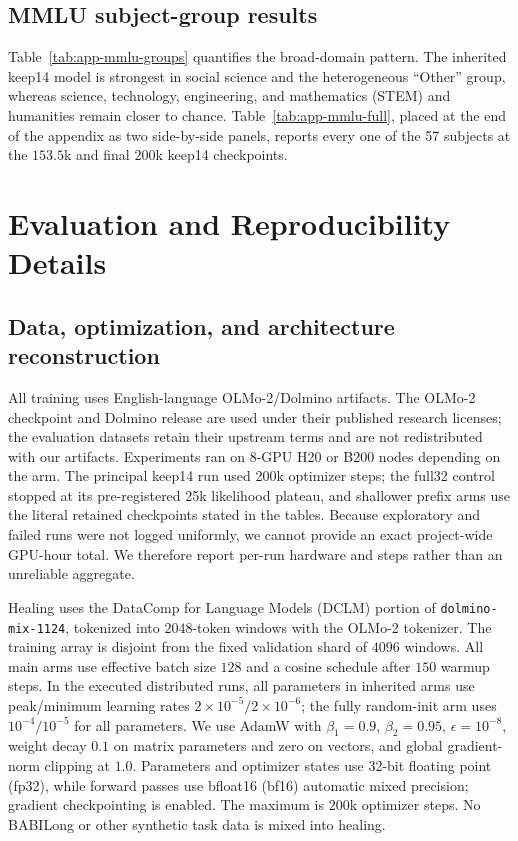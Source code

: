 \subsection{MMLU subject-group results}
\label{app:mmlu-subjects}


Table~\ref{tab:app-mmlu-groups} quantifies the broad-domain pattern. The inherited keep14 model is strongest in
social science and the heterogeneous ``Other'' group, whereas science, technology, engineering, and mathematics (STEM) and humanities
remain closer to chance. Table~\ref{tab:app-mmlu-full}, placed at the
end of the appendix as two side-by-side panels, reports every one of the 57
subjects at the $153.5$k and final $200$k keep14 checkpoints.

\section{Evaluation and Reproducibility Details}
\label{app:repro}

\subsection{Data, optimization, and architecture reconstruction}

All training uses English-language OLMo-2/Dolmino artifacts. The OLMo-2
checkpoint and Dolmino release are used under their published research licenses;
the evaluation datasets retain their upstream terms and are not redistributed
with our artifacts. Experiments ran on 8-GPU H20 or B200 nodes depending on the
arm. The principal keep14 run used 200k optimizer steps; the full32 control
stopped at its pre-registered 25k likelihood plateau, and shallower prefix arms
use the literal retained checkpoints stated in the tables. Because exploratory
and failed runs were not logged uniformly, we cannot provide an exact
project-wide GPU-hour total. We therefore report per-run hardware and steps
rather than an unreliable aggregate.

Healing uses the DataComp for Language Models (DCLM) portion of
\texttt{dolmino-mix-1124}, tokenized into $2048$-token windows with the OLMo-2
tokenizer. The training array is disjoint from the fixed validation shard of
$4096$ windows. All main arms use effective batch size $128$ and a cosine
schedule after $150$ warmup steps. In the executed distributed runs, all
parameters in inherited arms use peak/minimum learning rates
$2\times10^{-5}/2\times10^{-6}$; the fully random-init arm uses
$10^{-4}/10^{-5}$ for all parameters. We use AdamW with $\beta_1{=}0.9$,
$\beta_2{=}0.95$, $\epsilon{=}10^{-8}$, weight decay $0.1$ on matrix parameters
and zero on vectors, and global gradient-norm clipping at $1.0$. Parameters and
optimizer states use 32-bit floating point (fp32), while forward passes use
bfloat16 (bf16) automatic mixed precision; gradient checkpointing is enabled.
The maximum is $200$k optimizer steps. No BABILong or other synthetic task data
is mixed into healing.

